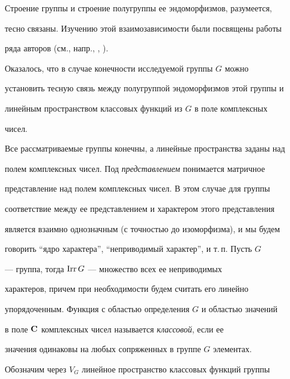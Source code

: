 




\maketitle


\label{begin}





Строение группы и строение полугруппы ее эндоморфизмов, разумеется,


тесно связаны. Изучению этой взаимозависимости были посвящены работы


ряда авторов (см., напр., \cite{Dolgarev}, \cite{Pousemp}).


Оказалось, что в случае конечности исследуемой группы $G$ можно


установить тесную связь между полугруппой эндоморфизмов этой группы и


линейным пространством классовых функций из $G$ в поле комплексных


чисел.





Все рассматриваемые группы конечны, а линейные пространства заданы над


полем комплексных чисел. Под {\it представлением} понимается матричное


представление над полем комплексных чисел. В этом случае для группы


соответствие между ее представлением и характером этого представления


является взаимно однозначным (с точностью до изоморфизма), и мы будем


говорить ``ядро характера'', ``неприводимый характер'', и т.\,п. Пусть $G$


--- группа, тогда $\operatorname{Irr} G$ --- множество всех ее неприводимых


характеров, причем при необходимости будем считать его линейно


упорядоченным. Функция с областью определения $G$ и областью значений


в поле $\bold C$ комплексных чисел называется {\it классовой}, если ее


значения одинаковы на любых сопряженных в группе $G$ элементах.


Обозначим через $V_{G}$ линейное пространство классовых функций группы


